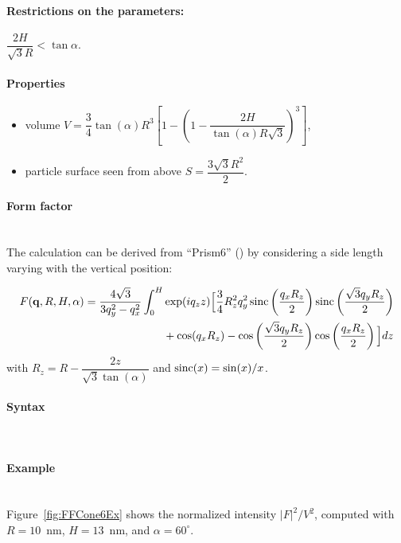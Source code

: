 \paragraph{Restrictions on the parameters:} 
$\dfrac{2H}{\sqrt{3}R}< \tan{\alpha}$.

\paragraph{Properties}
\begin{itemize}
\item volume $V = \dfrac{3}{4} \tan(\alpha) R^3 \left[
            1 - \left(1- \dfrac{2H}{ \tan(\alpha) R\sqrt{3}}\right)^3
            \right]$,
\item  particle surface seen from above $S =\dfrac{3\sqrt{3}R^2}{2}$.
\end{itemize}

\paragraph{Form factor}\strut\\
The
calculation can be derived from ``Prism6'' () by
considering a side length varying with the vertical position:

\begin{align*}
F(\mathbf{q}, R, H, \alpha) = \frac{4\sqrt{3}}{3q_y ^2 - q_x^2}\int_0 ^H &\exp(iq_z z)
\Big[\frac{3}{4}R_z^2q_y^2 \operatorname{sinc}\left(\frac{q_xR_z}{2}\right)\operatorname{sinc}\left(\frac{\sqrt{3}q_y
R_z}{2}\right)\\
&+\cos(q_xR_z)-\cos\left(\frac{\sqrt{3}q_y R_z}{2}\right)\cos\left(\frac{q_xR_z}{2}\right) \Big]dz
\end{align*}
with $R_z=R-\dfrac{2z}{\sqrt{3}\tan(\alpha)}$ and $\operatorname{sinc}(x)=\sin(x)/x$.

\paragraph{Syntax}\strut\\

\paragraph{Example}\strut\\
Figure~\ref{fig:FFCone6Ex} shows the normalized intensity
$|F|^2/V^2$, computed with $R=10$~nm, $H=13$~nm, and
$\alpha=60^{\circ}$.

